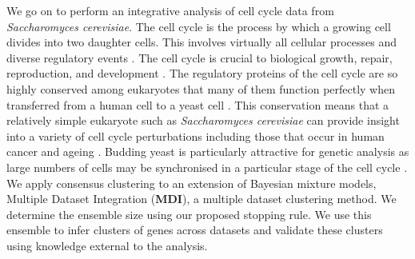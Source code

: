 \documentclass{bioinfo}
\begin{document}
We go on to perform an integrative analysis of cell cycle data from \emph{Saccharomyces cerevisiae}. The cell cycle is the process by which a growing cell divides into two daughter cells. This involves virtually all cellular processes 
and diverse regulatory events \citep{granovskaia2010high}. The cell cycle is crucial to biological growth, repair, reproduction, and development
\citep{tyson2013cell, chen2004integrative, alberts2018molecular}. The regulatory proteins of the 
cell cycle are so highly conserved among eukaryotes that many of them function perfectly when transferred from a human cell to a yeast cell \citep{alberts2018molecular}. This conservation means that a relatively simple eukaryote such as \emph{Saccharomyces cerevisiae} can provide insight into a variety of cell cycle perturbations including those that occur in human cancer \citep{ingalls2007systems, chen2004integrative} and ageing \citep{jimenez2015live}. Budding yeast is particularly attractive for genetic analysis as
large numbers of cells may be synchronised in a particular stage of the cell cycle  \citep{juanes2017methods}. We apply consensus clustering to an extension of Bayesian mixture models, Multiple Dataset Integration (\textbf{MDI}), a multiple dataset clustering method. 
We determine the ensemble size using our proposed stopping rule. We use this ensemble to infer clusters of genes across datasets and validate these clusters using knowledge external to the analysis. 

\end{document}
